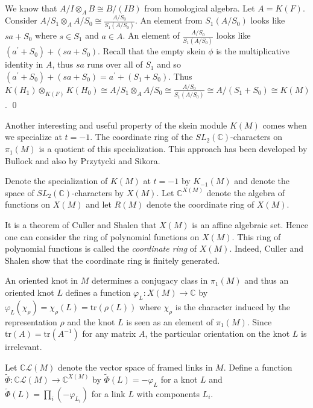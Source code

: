 \documentclass{slides}
\newcommand{\ot}{\otimes}
\newcommand{\tr}{\mathrm{tr}}
\begin{document}
\begin{slide}
We know that $A/I \ot_A B \cong B/(IB)$ from homological algebra.
Let $A = K(F)$.  Consider $A/S_1 \ot_A A/S_0 \cong \frac{A/S_0}{S_1 (A/S_0)}$.
An element from $S_1 (A/S_0)$ looks like $sa + S_0$ where $s \in S_1$
and $a \in A$.
An element of $\frac{A/S_0}{S_1 (A/S_0)}$ looks like
$(a^{\prime} + S_0) + (sa + S_0)$.
Recall that the empty skein $\phi$ is the multiplicative
identity in $A$, thus $sa$ runs over all of $S_1$ and so
$(a^{\prime} + S_0) + (sa + S_0) = a^{\prime} + (S_1 + S_0)$.
Thus $K(H_1) \ot_{K(F)} K(H_0) \cong A/S_1 \ot_A A/S_0
\cong \frac{A/S_0}{S_1 (A/S_0)} \cong A/(S_1 + S_0) \cong K(M)$.
\qed
\end{slide}

\begin{slide}

Another interesting and useful property of the skein module $K(M)$ comes
when we specialize at $t=-1$.  The coordinate ring of
the $SL_2(\mathbb{C})$-characters on $\pi_1(M)$
is a quotient of this specialization.
This approach has been 
developed by Bullock and also by
Przytycki and Sikora.

Denote the specialization of $K(M)$ at $t=-1$ by $K_{-1}(M)$
and denote the space of $SL_2(\mathbb{C})$-characters by $X(M)$.
Let $\mathbb{C}^{X(M)}$ denote the algebra of functions on
$X(M)$ and let $R(M)$ denote the coordinate ring of $X(M)$.

It is a theorem of Culler and Shalen that
$X(M)$ is an affine algebraic set.  Hence one can consider
the ring of polynomial functions on $X(M)$.  This ring of polynomial
functions is called the \textit{coordinate ring} of $X(M)$.
Indeed, Culler and Shalen show that the coordinate ring is
finitely generated.
\end{slide}

\begin{slide}
An oriented knot in $M$ determines a conjugacy class in $\pi_1(M)$
and thus an oriented knot $L$ defines a function
$\varphi_L : X(M) \to \mathbb{C}$ by $\varphi_L (\chi_{\rho}) = \chi_{\rho}(L) = \tr(\rho(L))$
where $\chi_{\rho}$ is the character induced by the representation $\rho$
and the knot $L$ is seen as an element of $\pi_1(M)$.
Since $\tr(A) = \tr(A^{-1})$ for any matrix $A$, the particular orientation on
the knot $L$ is irrelevant.

Let $\mathbb{C}\mathcal{L}(M)$ denote the vector space of
framed links in $M$.  Define a function
$\tilde{\Phi} : \mathbb{C}\mathcal{L}(M) \to \mathbb{C}^{X(M)}$ by
$\tilde{\Phi}(L) = - \varphi_L$ for a knot $L$ and
$\tilde{\Phi}(L) = \prod_i (-\varphi_{L_i})$ for a link
$L$ with components $L_i$.
\end{slide}
\end{document}

